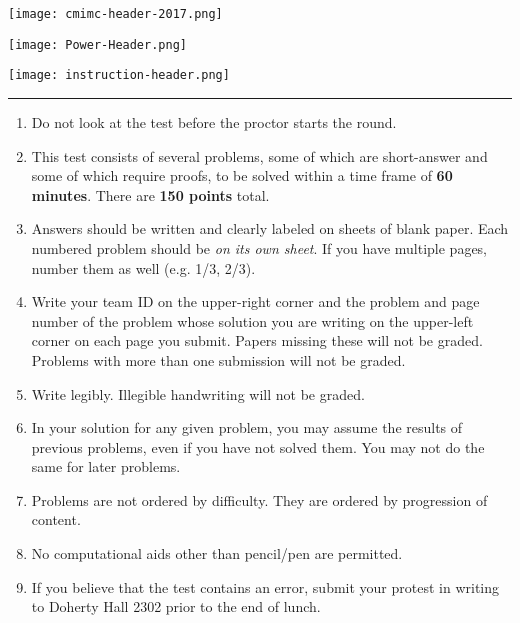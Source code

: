 \documentclass[12pt]{article}
\theoremstyle{plain}
\theoremstyle{definition}
\theoremstyle{remark}
\begin{document}
\thispagestyle{empty}

\begin{center}

\vspace*{70pt}

\texttt{[image: cmimc-header-2017.png]}

\texttt{[image: Power-Header.png]}

\end{center}

\vspace{40pt}

\begin{center}
\texttt{[image: instruction-header.png]}
\noindent\rule{17.7cm}{2pt}
\end{center}

\vspace{6pt}

\begin{enumerate}
\item Do not look at the test before the proctor starts the round.

\item This test consists of several problems, some of which are short-answer and some of which require proofs, to be solved within a time frame of \textbf{60 minutes}. There are \textbf{150 points} total.

\item Answers should be written and clearly labeled on sheets of blank paper. Each numbered problem should be \textit{on its own sheet}. If you have multiple pages, number them as well (e.g. 1/3, 2/3).

\item Write your team ID on the upper-right corner and the problem and page number of the problem whose solution you are writing on the upper-left corner on each page you submit. Papers missing these will not be graded. Problems with more than one submission will not be graded.

\item Write legibly. Illegible handwriting will not be graded.

\item In your solution for any given problem, you may assume the results of previous problems, even if you have not solved them. You may not do the same for later problems.

\item Problems are not ordered by difficulty. They are ordered by progression of content.

\item No computational aids other than pencil/pen are permitted.

\item If you believe that the test contains an error, submit your protest in writing to Doherty Hall 2302 prior to the end of lunch.
\end{enumerate}
\end{document}
